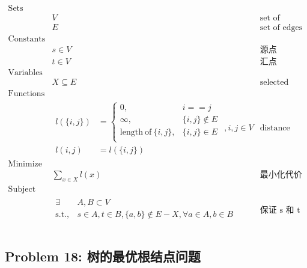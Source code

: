 \documentclass[11pt]{article}
\begin{document}
\begin{eqnarray*}
    \textrm{Sets} \\
        & V & \textrm{set of vertices} \\
        & E & \textrm{set of edges} \\
    \textrm{Constants} \\
        & s \in V & \textrm{源点} \\
        & t \in V & \textrm{汇点} \\
    \textrm{Variables} \\
        & X \subseteq E & \textrm{selected edges} \\
    \textrm{Functions} \\
        & \begin{array}{rl}
            l(\{i, j\}) &= \left\{
                \begin{array}{ll}
                    0,                              & i == j \\
                    \infty,                         & \{i, j\} \notin E \\
                    \mathrm{length\ of\ }\{i, j\},  & \{i, j\} \in E \\
                \end{array}
            \right. \\
            l(i, j) &= l(\{i, j\})
        \end{array}, i, j \in V & \textrm{distance between vertices} \\
    \textrm{Minimize} \\
        & \displaystyle \sum_{x \in X} l(x) & \textrm{最小化代价} \\
    \textrm{Subject to} \\
        & \begin{array}{rl}
            \exists & A, B \subset V \\
            \mathrm{s.t.,} & s \in A, t \in B, \{a, b\} \notin E - X, \forall a \in A, b \in B \\
        \end{array} & \textrm{保证 s 和 t 不联通} \\ 
\end{eqnarray*}


\newpage
\subsection*{Problem 18: 树的最优根结点问题}
\end{document}
